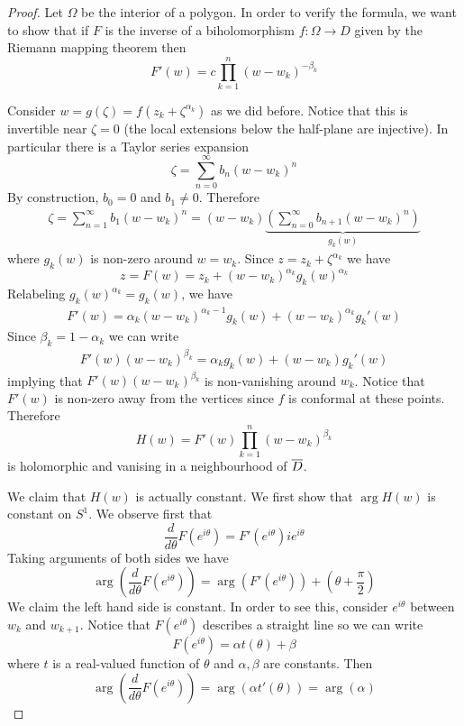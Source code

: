 \begin{proof}
    Let $\Omega$ be the interior of a polygon. In order to verify the formula, we want to show that if $F$ is the inverse of a biholomorphism $f: \Omega \to D$ given by the Riemann mapping theorem then
    $$F'(w) = c \prod_{k = 1}^n (w - w_k)^{-\beta_k}$$

    Consider $w = g(\zeta) = f(z_k + \zeta^{\alpha_k})$ as we did before. Notice that this is invertible near $\zeta = 0$ (the local extensions below the half-plane are injective). In particular there is a Taylor series expansion 
    $$\zeta = \sum_{n = 0}^\infty b_n (w - w_k)^n$$
    By construction, $b_0 = 0$ and $b_1 \neq 0$. Therefore 
    \begin{align*}
        \zeta = \sum_{n = 1}^\infty b_1 (w - w_k)^n = (w - w_k) \underbrace{\left( \sum_{n = 0}^\infty b_{n + 1} (w - w_k)^n \right)}_{g_k(w)}
    \end{align*}
    where $g_k(w)$ is non-zero around $w = w_k$. Since $z = z_k + \zeta^{\alpha_k}$ we have 
    $$z = F(w) = z_k + (w - w_k)^{\alpha_k} g_k(w)^{\alpha_k}$$
    Relabeling $g_k(w)^{\alpha_k} = g_k(w)$, we have 
    \begin{align*}
        F'(w) = \alpha_k (w - w_k)^{\alpha_k - 1} g_k(w) + (w - w_k)^{\alpha_k} g_k'(w)
    \end{align*}
    Since $\beta_k = 1 - \alpha_k$ we can write 
    \begin{align*}
        F'(w) (w - w_k)^{\beta_k} = \alpha_k g_k(w) + (w - w_k)g_k'(w)
    \end{align*} 
    implying that $F'(w)(w - w_k)^{\beta_k}$ is non-vanishing around $w_k$. Notice that $F'(w)$ is non-zero away from the vertices since $f$ is conformal at these points. Therefore 
    $$H(w) = F'(w) \prod_{k = 1}^n (w - w_k)^{\beta_k}$$
    is holomorphic and vanising in a neighbourhood of $\overline{D}$. 

    We claim that $H(w)$ is actually constant. We first show that $\arg H(w)$ is constant on $S^1$. We observe first that
    $$ \frac{d}{d\theta} F(e^{i\theta}) = F'(e^{i\theta}) i e^{i\theta} $$
    Taking arguments of both sides we have 
    $$ \arg \left( \frac{d}{d\theta} F(e^{i\theta}) \right) = \arg (F'(e^{i\theta})) + \left( \theta + \frac{\pi}{2} \right)$$
    We claim the left hand side is constant. In order to see this, consider $e^{i \theta}$ between $w_k$ and $w_{k + 1}$. Notice that $F(e^{i \theta})$ describes a straight line so we can write 
    $$F(e^{i \theta}) = \alpha t(\theta) + \beta$$
    where $t$ is a real-valued function of $\theta$ and $\alpha, \beta$ are constants. Then 
    $$ \arg \left( \frac{d}{d\theta} F(e^{i \theta}) \right) = \arg (\alpha t'(\theta)) = \arg (\alpha ) $$
    

\end{proof}
